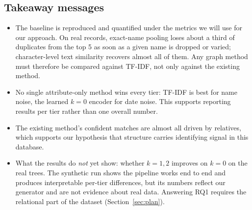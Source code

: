 \subsection*{Takeaway messages}
\begin{itemize}
\item The baseline is reproduced and quantified under the metrics we will use for our approach. On real records, exact-name pooling loses about a third of duplicates from the top 5 as soon as a given name is dropped or varied; character-level text similarity recovers almost all of them. Any graph method must therefore be compared against TF-IDF, not only against the existing method.
\item No single attribute-only method wins every tier: TF-IDF is best for name noise, the learned $k=0$ encoder for date noise. This supports reporting results per tier rather than one overall number.
\item The existing method's confident matches are almost all driven by relatives, which supports our hypothesis that structure carries identifying signal in this database.
\item What the results do \emph{not} yet show: whether $k=1,2$ improves on $k=0$ on the real trees. The synthetic run shows the pipeline works end to end and produces interpretable per-tier differences, but its numbers reflect our generator and are not evidence about real data. Answering RQ1 requires the relational part of the dataset (Section~\ref{sec:plan}).
\end{itemize}
